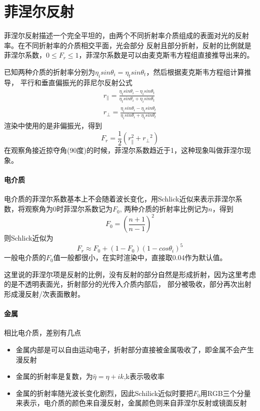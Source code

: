 \section{菲涅尔反射}
菲涅尔反射描述一个完全平坦的，由两个不同折射率介质组成的表面对光的反射率。在不同折射率的介质相交平面，光会部分
反射且部分折射，反射的比例就是菲涅尔系数，$0 \leq F_{r} \leq 1$，菲涅尔系数是可以由麦克斯韦方程组直接推导出来的。

已知两种介质的折射率分别为${\eta}_{i}sin{\theta}_{i}={\eta}_{t}sin{\theta}_{t}$，然后根据麦克斯韦方程组计算推导，
平行和垂直偏振光的菲尼尔反射公式
\begin{equation}
    \begin{aligned}
        r_{\parallel}=\frac{{\eta}_{t}sin{\theta}_{i} - {\eta}_{i}sin{\theta}_{t}}{ {\eta}_{t}sin{\theta}_{i} + {\eta}_{i}sin{\theta}_{t}} \\
        r_{\perp}=\frac{{\eta}_{i}sin{\theta}_{i} - {\eta}_{t}sin{\theta}_{t}}{ {\eta}_{i}sin{\theta}_{i} + {\eta}_{t}sin{\theta}_{t}}                
    \end{aligned}
\end{equation}
渲染中使用的是非偏振光，得到
$$
F_{r}=\frac{1}{2}({r_{\parallel}^2}+{r_{\perp}}^2)
$$
在观察角接近掠夺角(90度)的时候，菲涅尔系数趋近于1，这种现象叫做菲涅尔现象。

\paragraph{电介质}
电介质的菲涅尔系数基本上不会随着波长变化，用Schlick近似来表示菲涅尔系数，将观察角为0时菲涅尔系数记为$F_{0}$,
两种介质的折射率比例记为$n$，得到
$$
F_{0}=(\frac{n+1}{n-1})^2
$$
则Schlick近似为
$$
F_{r} \approx F_{0} + (1-F_{0})(1 - cos{\theta}_{i})^5
$$
一般电介质的$F_{0}$值一般都很小，在实时渲染中，直接取0.04作为默认值。

这里说的菲涅尔项是反射的比例，没有反射的部分自然是形成折射，因为这里考虑的是不透明表面光，折射部分的光传入介质内部后，
部分被吸收，部分再次出射形成漫反射/次表面散射。

\paragraph{金属}

相比电介质，差别有几点
\begin{itemize}
    \item {金属内部是可以自由运动电子，折射部分直接被金属吸收了，即金属不会产生漫反射}
    \item {金属的折射率是复数，为$\hat{\eta}=\eta+ik$,k表示吸收率}
    \item {金属的折射率随光波长变化剧烈，因此Schilick近似时要把$F_{0}$用RGB三个分量来表示，电介质的颜色来自漫反射，金属颜色则来自菲涅尔反射或镜面反射}
\end{itemize}

